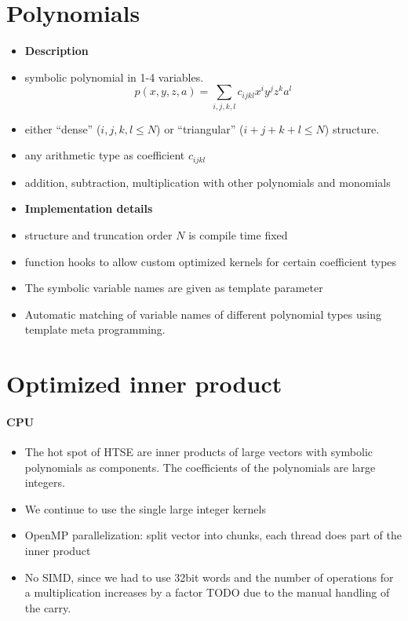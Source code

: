 \documentclass[oribibl]{llncs2e/llncs}
\begin{document}
\section{Polynomials}
\begin{itemize}
\item {\bf Description}
\item symbolic polynomial in 1-4 variables.
\begin{equation}
    p(x,y,z,a) = \sum_{i,j,k,l} c_{ijkl} x^i y^j z^k a^l
\end{equation}
\item either ``dense'' (${i,j,k,l} \le N$) or ``triangular'' ($i+j+k+l \le N$) structure.
\item any arithmetic type as coefficient $c_{ijkl}$
\item addition, subtraction, multiplication with other polynomials and monomials
\item {\bf Implementation details}
\item structure and truncation order $N$ is compile time fixed 
\item function hooks to allow custom optimized kernels for certain coefficient types
\item The symbolic variable names are given as template parameter
\item Automatic matching of variable names of different polynomial types using template meta programming.
\end{itemize}

\section{Optimized inner product}
\paragraph{CPU}
\begin{itemize}
\item The hot spot of HTSE are inner products of large vectors with symbolic polynomials as components. The coefficients of the polynomials are large integers.
\item We continue to use the single large integer kernels
\item OpenMP parallelization: split vector into chunks, each thread does part of the inner product
\item No SIMD, since we had to use 32bit words and the number of operations for a multiplication increases by a factor TODO due to the manual handling of the carry.
\end{itemize}
\end{document}
